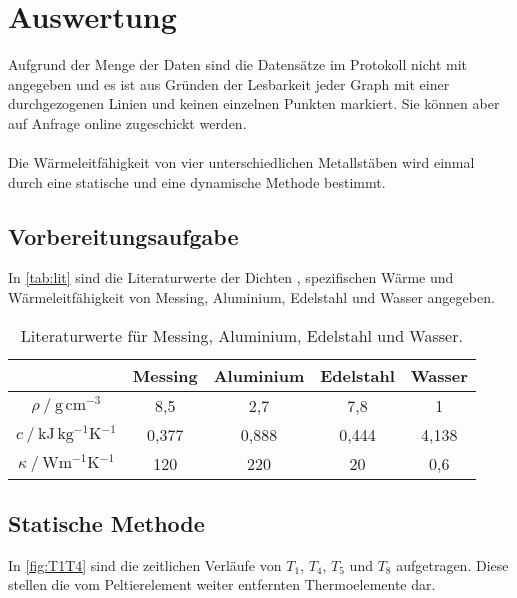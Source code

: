 \section{Auswertung}
\label{sec:Auswertung}
Aufgrund der Menge der Daten sind die Datensätze im Protokoll nicht mit angegeben und es ist aus Gründen der Lesbarkeit jeder Graph mit einer durchgezogenen Linien
und keinen einzelnen Punkten markiert.
Sie können aber auf Anfrage online zugeschickt werden.\\
\\
Die Wärmeleitfähigkeit von vier unterschiedlichen Metallstäben wird einmal durch eine statische und
eine dynamische Methode bestimmt.

\subsection{Vorbereitungsaufgabe}
\label{sec:Vorbereitung}
In \autoref{tab:lit} sind die Literaturwerte der Dichten \cite{dichten}, spezifischen Wärme \cite{spezifischeWaerme} und Wärmeleitfähigkeit \cite{waermeleitfähigkeit}
von Messing, Aluminium, Edelstahl und Wasser angegeben.
\begin{table}
  \centering
  \caption{Literaturwerte für Messing, Aluminium, Edelstahl und Wasser.}
  \label{tab:lit}
  \begin{tabular}{c| c c c c}
    \toprule
     & Messing & Aluminium & Edelstahl & Wasser \\
    \midrule
    $\rho \mathbin{/} \si{\gram\,\cm^{-3}}$                       & 8,5 & 2,7 & 7,8 & 1 \\
    $c \mathbin{/} \si{\kilo\joule\,\kilogram^{-1}\kelvin^{-1}}$  & 0,377 & 0,888 & 0,444 & 4,138 \\
    $\kappa \mathbin{/}\si{\watt\meter^{-1}\kelvin^{-1}}$         & 120 & 220 & 20 & 0,6 \\
    \bottomrule
  \end{tabular}
\end{table} 

\subsection{Statische Methode}
\label{sec:stat}

In \autoref{fig:T1T4} sind die zeitlichen Verläufe von $T_1$, $T_4$, $T_5$ und $T_8$ aufgetragen. Diese stellen die vom Peltierelement weiter
entfernten Thermoelemente dar.

